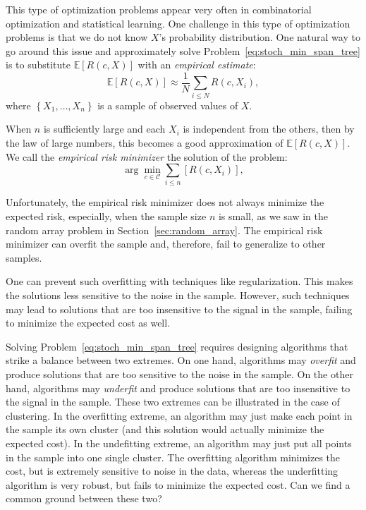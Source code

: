 This type of optimization problems appear very often in combinatorial optimization and statistical learning. One challenge in this type of optimization problems is that we do not know $X$'s probability distribution.
One natural way to go around this issue and approximately solve Problem~\ref{eq:stoch_min_span_tree} is to substitute $\mathbb{E}\left[R(c, X)\right]$ with an \emph{empirical estimate}:
%
$$\mathbb{E}\left[R(c, X)\right] \approx \frac{1}{N}\sum_{i \leq N} R(c, X_i),$$
%
where $\left\{X_1, \ldots, X_n\right\}$ is a sample of observed values of $X$.

When $n$ is sufficiently large and each $X_i$ is independent from the others, then by the law of large numbers, this becomes a good approximation of $\mathbb{E}\left[R(c, X)\right]$. We call the \emph{empirical risk minimizer} the solution of the problem:
%
\begin{equation}
\arg \min_{c \in \mathcal{C}} \sum_{i \leq n}\left[R(c, X_i)\right],
\label{eq:erm}
\end{equation}

Unfortunately, the empirical risk minimizer does not always minimize the expected risk, especially, when the sample size $n$ is small, as we saw in the random array problem in Section~\ref{sec:random_array}. The empirical risk minimizer can overfit the sample and, therefore, fail to generalize to other samples.

One can prevent such overfitting with techniques like regularization. This makes the solutions less sensitive to the noise in the sample. However, such techniques may lead to solutions that are too insensitive to the signal in the sample, failing to minimize the expected cost as well.

Solving Problem~\ref{eq:stoch_min_span_tree} requires designing algorithms that strike a balance between two extremes. On one hand, algorithms may \emph{overfit} and produce solutions that are too sensitive to the noise in the sample. On the other hand, algorithms may \emph{underfit} and produce solutions that are too insensitive to the signal in the sample. 
These two extremes can be illustrated in the case of clustering.
In the overfitting extreme, an algorithm may just make each point in the sample its own cluster (and this solution would actually minimize the expected cost). In the undefitting extreme, an algorithm may just put all points in the sample into one single cluster. The overfitting algorithm minimizes the cost, but is extremely sensitive to noise in the data, whereas the underfitting algorithm is very robust, but fails to minimize the expected cost. Can we find a common ground between these two?

